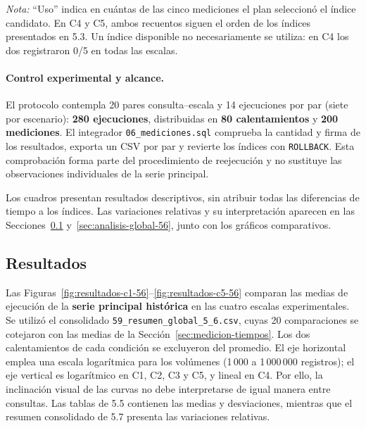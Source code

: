 \documentclass[12pt,a4paper]{article}
\begin{document}
\textit{Nota:} ``Uso'' indica en cuántas de las cinco mediciones
el plan seleccionó el índice candidato. En C4 y C5, ambos recuentos
siguen el orden de los índices presentados en 5.3. Un índice disponible
no necesariamente se utiliza: en C4 los dos registraron 0/5 en todas
las escalas.

\paragraph{Control experimental y alcance.}
El protocolo contempla 20 pares consulta--escala y 14 ejecuciones
por par (siete por escenario): \textbf{280 ejecuciones}, distribuidas
en \textbf{80 calentamientos} y \textbf{200 mediciones}. El integrador
\texttt{06\_mediciones.sql} comprueba la cantidad y firma de los
resultados, exporta un CSV por par y revierte los índices con
\texttt{ROLLBACK}. Esta comprobación forma parte del procedimiento
de reejecución y no sustituye las observaciones individuales de la
serie principal.

Los cuadros presentan resultados descriptivos, sin atribuir todas
las diferencias de tiempo a los índices. Las variaciones relativas
y su interpretación aparecen en las Secciones~\ref{sec:resultados-56}
y~\ref{sec:analisis-global-56}, junto con los gráficos comparativos.

\subsection{Resultados}
\label{sec:resultados-56}

Las Figuras~\ref{fig:resultados-c1-56}--\ref{fig:resultados-c5-56}
comparan las medias de ejecución de la \textbf{serie principal histórica}
en las cuatro escalas experimentales. Se utilizó el consolidado
\nolinkurl{59_resumen_global_5_6.csv}, cuyas 20 comparaciones
se cotejaron con las medias de la Sección~\ref{sec:medicion-tiempos}.
Los dos calentamientos de cada condición se excluyeron del promedio.
El eje horizontal emplea una escala logarítmica para los volúmenes
(1\,000 a 1\,000\,000 registros); el eje vertical es logarítmico en
C1, C2, C3 y C5, y lineal en C4. Por ello, la inclinación visual de
las curvas no debe interpretarse de igual manera entre consultas.
Las tablas de 5.5 contienen las medias y desviaciones, mientras que
el resumen consolidado de 5.7 presenta las variaciones relativas.

\Needspace{0.57\textheight}
\end{document}
